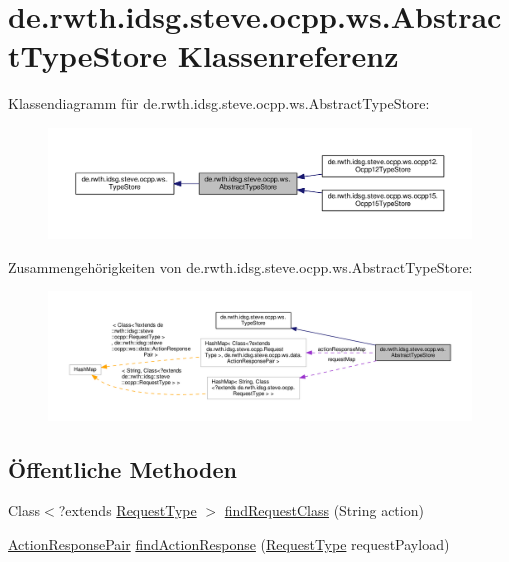 \hypertarget{classde_1_1rwth_1_1idsg_1_1steve_1_1ocpp_1_1ws_1_1_abstract_type_store}{\section{de.\-rwth.\-idsg.\-steve.\-ocpp.\-ws.\-Abstract\-Type\-Store Klassenreferenz}
\label{classde_1_1rwth_1_1idsg_1_1steve_1_1ocpp_1_1ws_1_1_abstract_type_store}
}


Klassendiagramm für de.\-rwth.\-idsg.\-steve.\-ocpp.\-ws.\-Abstract\-Type\-Store\-:
\nopagebreak
\begin{figure}[H]
\begin{center}
\leavevmode
\includegraphics[width=350pt]{classde_1_1rwth_1_1idsg_1_1steve_1_1ocpp_1_1ws_1_1_abstract_type_store__inherit__graph}
\end{center}
\end{figure}


Zusammengehörigkeiten von de.\-rwth.\-idsg.\-steve.\-ocpp.\-ws.\-Abstract\-Type\-Store\-:
\nopagebreak
\begin{figure}[H]
\begin{center}
\leavevmode
\includegraphics[width=350pt]{classde_1_1rwth_1_1idsg_1_1steve_1_1ocpp_1_1ws_1_1_abstract_type_store__coll__graph}
\end{center}
\end{figure}
\subsection*{Öffentliche Methoden}
\begin{DoxyCompactItemize}
\item 
Class$<$?extends \hyperlink{interfacede_1_1rwth_1_1idsg_1_1steve_1_1ocpp_1_1_request_type}{Request\-Type} $>$ \hyperlink{classde_1_1rwth_1_1idsg_1_1steve_1_1ocpp_1_1ws_1_1_abstract_type_store_a8dc2b68097f448a5ca6570cff4625f99}{find\-Request\-Class} (String action)
\item 
\hyperlink{classde_1_1rwth_1_1idsg_1_1steve_1_1ocpp_1_1ws_1_1data_1_1_action_response_pair}{Action\-Response\-Pair} \hyperlink{classde_1_1rwth_1_1idsg_1_1steve_1_1ocpp_1_1ws_1_1_abstract_type_store_ae179f4e949bfa7cf3f86fbcb0052f3e3}{find\-Action\-Response} (\hyperlink{interfacede_1_1rwth_1_1idsg_1_1steve_1_1ocpp_1_1_request_type}{Request\-Type} request\-Payload)
\end{DoxyCompactItemize}
